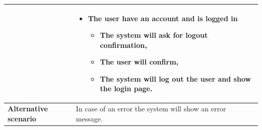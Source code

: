 \documentclass[12pt,a4paper]{report}
\begin{document}
\begin{table}[H]
	\begin{center}

		\setlength\doublerulesep{0.5pt}
\begin{tabular}{|  p{5cm}|  p{9cm}|}
	
	 &                        
	\begin{itemize}
	
		\item The user have an account and is logged in
		\begin{itemize}
			\item The system will ask for logout confirmation,
			\item The user will confirm,
			\item The system will log out the user and show the login page.
		\end{itemize}
		
		
	\end{itemize} 
	\\ \hline
	
	\textbf{Alternative scenario} &                        
	In case of an error the system will show an error message.
	\\ \hline
	
	

\end{tabular}

\end{center}

\end{table}
\end{document}
